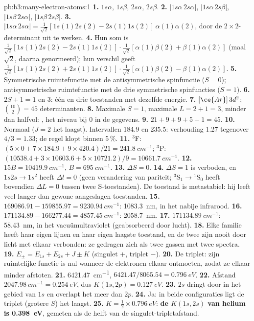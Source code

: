\begin{solution}{pb:b3:many-electron-atoms:1}
\textbf{1.} $1s\alpha$, $1s\beta$, $2s\alpha$, $2s\beta$.
\textbf{2.} $|1s\alpha\,2s\alpha|$, $|1s\alpha\,2s\beta|$, $|1s\beta\,2s\alpha|$,
$|1s\beta\,2s\beta|$.
\textbf{3.} $|1s\alpha\,2s\alpha| = \frac{1}{\sqrt2}[1s(1)2s(2) - 2s(1)1s(2)]\,
\alpha(1)\alpha(2)$, door de $2\times2$-determinant uit te werken.
\textbf{4.} Hun som is $\frac{1}{\sqrt2}[1s(1)2s(2) - 2s(1)1s(2)]\cdot
\frac{1}{\sqrt2}[\alpha(1)\beta(2) + \beta(1)\alpha(2)]$ (maal $\sqrt2$, daarna
genormeerd); hun verschil geeft $\frac{1}{\sqrt2}[1s(1)2s(2) +
2s(1)1s(2)]\cdot\frac{1}{\sqrt2}[\alpha(1)\beta(2) - \beta(1)\alpha(2)]$.
\textbf{5.} Symmetrische ruimtefunctie met de antisymmetrische spinfunctie
($S = 0$); antisymmetrische ruimtefunctie met de drie symmetrische
spinfuncties ($S = 1$).
\textbf{6.} $2S + 1 = 1$ en 3: één en drie toestanden met dezelfde energie.
\textbf{7.} $[\ce{Ar}]\,3d^2$; $\binom{10}{2} = 45$ determinanten.
\textbf{8.} Maximale $S = 1$, maximale $L = 2 + 1 = 3$, minder dan halfvol:
, het niveau bij 0 in de gegevens.
\textbf{9.} $21 + 9 + 9 + 5 + 1 = 45$.
\textbf{10.} Normaal ($J = 2$ het laagst). Intervallen 184.9 en 235.5:
verhouding 1.27 tegenover $4/3 = 1.33$; de regel klopt binnen 5\,\%.
\textbf{11.} ${}^3$F: $(5 \times 0 + 7 \times 184.9 + 9 \times 420.4)/21 =
\qty{241.8}{cm^{-1}}$; ${}^3$P: $(10538.4 + 3 \times 10603.6 + 5 \times
10721.2)/9 = \qty{10661.7}{cm^{-1}}$.
\textbf{12.} $15B = \qty{10419.9}{cm^{-1}}$, $B = \qty{695}{cm^{-1}}$.
\textbf{13.} $\Delta S = 0$.
\textbf{14.} $\Delta S = 1$ is verboden, en $1s2s \to 1s^2$ heeft $\Delta l = 0$
(geen verandering van pariteit; ${}^3$S$_1 \to {}^1$S$_0$ heeft bovendien
$\Delta L = 0$ tussen twee S-toestanden). De toestand is metastabiel: hij
leeft veel langer dan gewone aangeslagen toestanden.
\textbf{15.} $169086.91 - 159855.97 = \qty{9230.94}{cm^{-1}}$: \qty{1083.3}{nm}, in
het nabije infrarood.
\textbf{16.} $171134.89 - 166277.44 = \qty{4857.45}{cm^{-1}}$: \qty{2058.7}{nm}.
\textbf{17.} $\qty{171134.89}{cm^{-1}}$: \qty{58.43}{nm}, in het
vacuümultraviolet (geabsorbeerd door lucht).
\textbf{18.} Elke familie heeft haar eigen lijnen en haar eigen laagste
toestand, en de twee zijn nooit door licht met elkaar verbonden: ze
gedragen zich als twee gassen met twee spectra.
\textbf{19.} $E_\pm = E_{1s} + E_{2s} + J \pm K$ (singulet $+$, triplet $-$).
\textbf{20.} De triplet: zijn ruimtelijke functie is nul wanneer de
elektronen elkaar ontmoeten, zodat ze elkaar minder afstoten.
\textbf{21.} \qty{6421.47}{cm^{-1}}, $6421.47/8065.54 = \qty{0.796}{eV}$.
\textbf{22.} Afstand $\qty{2047.98}{cm^{-1}} = \qty{0.254}{eV}$, dus $K(1s,2p) =
\qty{0.127}{eV}$.
\textbf{23.} $2s$ dringt door in het gebied van $1s$ en overlapt het meer
dan $2p$.
\textbf{24.} Ja: in beide configuraties ligt de triplet (grotere $S$) het laagst.
\textbf{25.} $K = \frac12 \times \qty{0.796}{eV}$: \textbf{de
 $K(1s,2s)$ van helium is \qty{0.398}{eV}}, gemeten
als de helft van de singulet-tripletafstand.
\end{solution}
